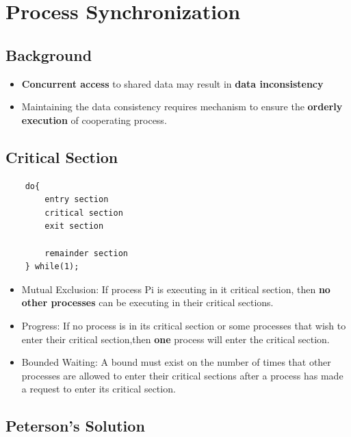 \documentclass[10pt]{article}
\newcommand{\tf}{\textbf}
\begin{document}
\newpage 
\section{Process Synchronization}

\subsection{Background}

\begin{itemize}
	\item \tf{Concurrent access} to shared data may result in \tf{data inconsistency}
	\item Maintaining the data consistency requires mechanism to ensure the \tf{orderly execution} of cooperating process.
\end{itemize}

\subsection{Critical Section}

\begin{verbatim}
	do{
		entry section
		critical section
		exit section

		remainder section
	} while(1);
\end{verbatim}

\begin{itemize}
	\item Mutual Exclusion: If process Pi is executing in it critical section, then \tf{no other processes} can be executing in their critical sections.
	\item Progress: If no process is in its critical section or some processes that wish to enter their critical section,then \tf{one} process will enter the critical section.
	\item Bounded Waiting: A bound must exist on the number of times that other processes are allowed to enter their critical sections after a process has made a request to enter its
	critical section.
\end{itemize}

\subsection{Peterson's Solution}
\end{document}
